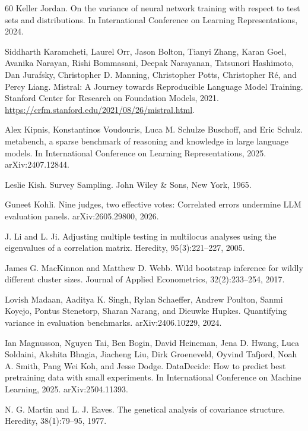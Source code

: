 \begin{thebibliography}{60}
Keller Jordan. On the variance of neural network training with respect to test sets and distributions. In International Conference on Learning Representations, 2024.

Siddharth Karamcheti, Laurel Orr, Jason Bolton, Tianyi Zhang, Karan Goel, Avanika Narayan, Rishi Bommasani, Deepak Narayanan, Tatsunori Hashimoto, Dan Jurafsky, Christopher D. Manning, Christopher Potts, Christopher R\'{e}, and Percy Liang. Mistral: A Journey towards Reproducible Language Model Training. Stanford Center for Research on Foundation Models, 2021. \url{https://crfm.stanford.edu/2021/08/26/mistral.html}.

Alex Kipnis, Konstantinos Voudouris, Luca M. Schulze Buschoff, and Eric Schulz. metabench, a sparse benchmark of reasoning and knowledge in large language models. In International Conference on Learning Representations, 2025. arXiv:2407.12844.

Leslie Kish. Survey Sampling. John Wiley \& Sons, New York, 1965.

Guneet Kohli. Nine judges, two effective votes: Correlated errors undermine LLM evaluation panels. arXiv:2605.29800, 2026.

J. Li and L. Ji. Adjusting multiple testing in multilocus analyses using the eigenvalues of a correlation matrix. Heredity, 95(3):221--227, 2005.

James G. MacKinnon and Matthew D. Webb. Wild bootstrap inference for wildly different cluster sizes. Journal of Applied Econometrics, 32(2):233--254, 2017.

Lovish Madaan, Aaditya K. Singh, Rylan Schaeffer, Andrew Poulton, Sanmi Koyejo, Pontus Stenetorp, Sharan Narang, and Dieuwke Hupkes. Quantifying variance in evaluation benchmarks. arXiv:2406.10229, 2024.

Ian Magnusson, Nguyen Tai, Ben Bogin, David Heineman, Jena D. Hwang, Luca Soldaini, Akshita Bhagia, Jiacheng Liu, Dirk Groeneveld, Oyvind Tafjord, Noah A. Smith, Pang Wei Koh, and Jesse Dodge. DataDecide: How to predict best pretraining data with small experiments. In International Conference on Machine Learning, 2025. arXiv:2504.11393.

N. G. Martin and L. J. Eaves. The genetical analysis of covariance structure. Heredity, 38(1):79--95, 1977.


\end{thebibliography}
